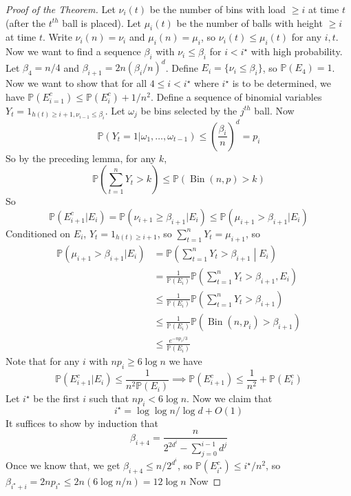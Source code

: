 \begin{proof}[Proof of the Theorem]
    Let $\nu_i(t)$ be the number of bins with load $\ge i$ at time $t$ (after the $t^{th}$ ball is placed).
    Let $\mu_i(t)$ be the number of balls with height $\ge i$ at time $t$.
    Write $\nu_i(n)=\nu_i$ and $\mu_i(n)=\mu_i$, so $\nu_i(t)\le\mu_i(t)$ for any $i,t$.
    Now we want to find a sequence $\beta_i$ with $\nu_i\le\beta_i$ for $i< i^\star$ with high probability.
    Let $\beta_4=n/4$ and $\beta_{i+1}=2n(\beta_i/n)^d$.
    Define $E_i=\{\nu_i\le\beta_i\}$, so $\mathbb P(E_4)=1$.
    Now we want to show that for all $4\le i<i^\star$ where $i^\star$ is to be determined, we have $\mathbb P(E_{i=1}^c)\le\mathbb P(E_i^c)+1/n^2$.
    Define a sequence of binomial variables $Y_t=1_{h(t)\ge i+1,\nu_{i-1}\le\beta_i}$.
    Let $\omega_j$ be bins selected by the $j^{th}$ ball.
    Now
    $$\mathbb P(Y_t=1|\omega_1,\ldots,\omega_{t-1})\le\left( \frac{\beta_i}{n} \right)^d=p_i$$
    So by the preceding lemma, for any $k$,
    $$\mathbb P\left( \sum_{t=1}^nY_t>k \right)\le\mathbb P(\operatorname{Bin}(n,p)>k)$$
    So
    $$\mathbb P(E_{i+1}^c|E_i)=\mathbb P(\nu_{i+1}\ge\beta_{i+1}|E_i)\le\mathbb P(\mu_{i+1}>\beta_{i+1}|E_i)$$
    Conditioned on $E_i$, $Y_t=1_{h(t)\ge i+1}$, so $\sum_{t=1}^nY_t=\mu_{i+1}$, so
    \begin{align*}
        \mathbb P(\mu_{i+1}>\beta_{i+1}|E_i)&=\mathbb P\left( \sum_{t=1}^nY_t>\beta_{i+1}\middle|E_i \right)\\
        &=\frac{1}{\mathbb P(E_i)}\mathbb P\left( \sum_{t=1}^nY_t>\beta_{i+1},E_i \right)\\
        &\le\frac{1}{\mathbb P(E_i)}\mathbb P\left( \sum_{t=1}^nY_t>\beta_{i+1}\right)\\
        &\le\frac{1}{\mathbb P(E_i)}\mathbb P(\operatorname{Bin}(n,p_i)>\beta_{i+1})\\
        &\le\frac{e^{-np_i/3}}{\mathbb P(E_i)}
    \end{align*}
    Note that for any $i$ with $np_i\ge 6\log n$ we have
    $$\mathbb P(E_{i+1}^c|E_i)\le\frac{1}{n^2\mathbb P(E_i)}\implies\mathbb P(E_{i+1}^c)\le\frac{1}{n^2}+\mathbb P(E_i^c)$$
    Let $i^\star$ be the first $i$ such that $np_i<6\log n$.
    Now we claim that
    $$i^\star=\log\log n/\log d+O(1)$$
    It suffices to show by induction that
    $$\beta_{i+4}=\frac{n}{2^{2d^i}-\sum_{j=0}^{i-1}d^j}$$
    Once we know that, we get $\beta_{i+4}\le n/2^{d^i}$, so $\mathbb P(E_{i^\star}^c)\le i^\star/n^2$, so $\beta_{i^\star+i}=2np_{i^\star}\le 2n(6\log n/n)=12\log n$
    Now
    

\end{proof}

